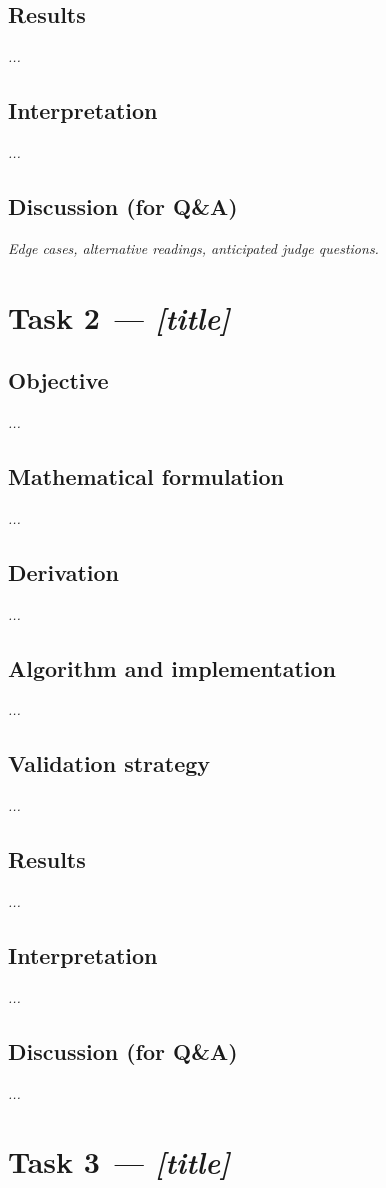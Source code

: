 \documentclass[12pt,a4paper]{article}
\newcommand{\ph}[1]{\textit{\textcolor{phgray}{#1}}}
\begin{document}
\subsection{Results}\ph{...}
\subsection{Interpretation}\ph{...}
\subsection{Discussion (for Q\&A)}\ph{Edge cases, alternative readings, anticipated judge questions.}

\section{Task 2 \ph{— [title]}}
\subsection{Objective}\ph{...}
\subsection{Mathematical formulation}\ph{...}
\subsection{Derivation}\ph{...}
\subsection{Algorithm and implementation}\ph{...}
\subsection{Validation strategy}\ph{...}
\subsection{Results}\ph{...}
\subsection{Interpretation}\ph{...}
\subsection{Discussion (for Q\&A)}\ph{...}

\section{Task 3 \ph{— [title]}}
\end{document}
